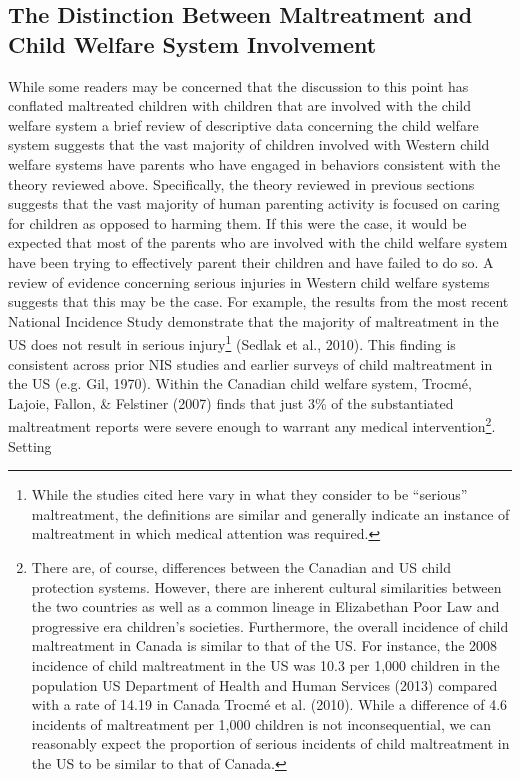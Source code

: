 \documentclass[review]{elsarticle}\usepackage[]{graphicx}\usepackage[]{color}
\begin{document}
\subsection{The Distinction Between Maltreatment and Child Welfare
System
Involvement}\label{the-distinction-between-maltreatment-and-child-welfare-system-involvement}

While some readers may be concerned that the discussion to this point
has conflated maltreated children with children that are involved with
the child welfare system a brief review of descriptive data concerning
the child welfare system suggests that the vast majority of children
involved with Western child welfare systems have parents who have
engaged in behaviors consistent with the theory reviewed above.
Specifically, the theory reviewed in previous sections suggests that the
vast majority of human parenting activity is focused on caring for
children as opposed to harming them. If this were the case, it would be
expected that most of the parents who are involved with the child
welfare system have been trying to effectively parent their children and
have failed to do so. A review of evidence concerning serious injuries
in Western child welfare systems suggests that this may be the case. For
example, the results from the most recent National Incidence Study
demonstrate that the majority of maltreatment in the US does not result
in serious injury\footnote{While the studies cited here vary in what
  they consider to be ``serious'' maltreatment, the definitions are
  similar and generally indicate an instance of maltreatment in which
  medical attention was required.} (Sedlak et al., 2010). This finding
is consistent across prior NIS studies and earlier surveys of child
maltreatment in the US (e.g. Gil, 1970). Within the Canadian child
welfare system, Trocm{é}, Lajoie, Fallon, \& Felstiner (2007) finds that
just 3\% of the substantiated maltreatment reports were severe enough to
warrant any medical intervention\footnote{There are, of course,
  differences between the Canadian and US child protection systems.
  However, there are inherent cultural similarities between the two
  countries as well as a common lineage in Elizabethan Poor Law and
  progressive era children's societies. Furthermore, the overall
  incidence of child maltreatment in Canada is similar to that of the
  US. For instance, the 2008 incidence of child maltreatment in the US
  was 10.3 per 1,000 children in the population US Department of Health
  and Human Services (2013) compared with a rate of 14.19 in Canada
  Trocm{é} et al. (2010). While a difference of 4.6 incidents of
  maltreatment per 1,000 children is not inconsequential, we can
  reasonably expect the proportion of serious incidents of child
  maltreatment in the US to be similar to that of Canada.}. Setting
\end{document}
